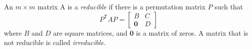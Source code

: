 \begin{definition}
An $m\times m$ matrix A is a \emph{reducible}
if there is a permutation matrix $P$ such that
\begin{equation}
   P^{\textsf{T}} A P =
      \begin{bmatrix}
         B & C \\
        \textbf{0} & D 
      \end{bmatrix}
\label{eqn:reducibleblockstructure}
\end{equation}
where $B$ and $D$ are square matrices, and $\textbf{0}$
is a matrix of zeros.
A matrix that is not reducible is called \emph{irreducible}.
\end{definition}

